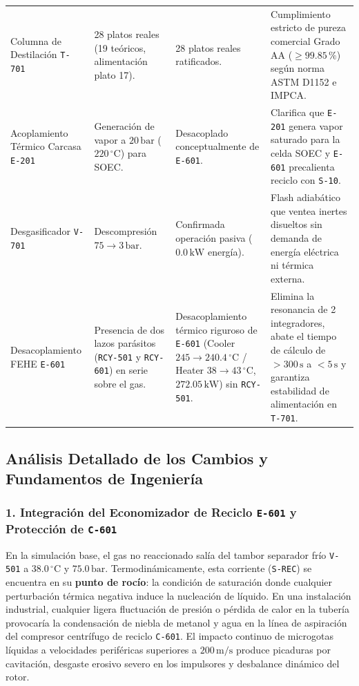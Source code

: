 \documentclass[11pt,a4paper]{article}
\begin{document}
\begin{table}[H]
\begin{tabularx}{\textwidth}{p{3.8cm} p{3.3cm} p{3.5cm} X}
\addlinespace
Columna de Destilación \texttt{T-701} & 28 platos reales (19 teóricos, alimentación plato 17). & 28 platos reales ratificados. & Cumplimiento estricto de pureza comercial Grado AA ($\ge 99.85\,\%$) según norma ASTM D1152 e IMPCA. \\
\addlinespace
Acoplamiento Térmico Carcasa \texttt{E-201} & Generación de vapor a $20\,\text{bar}$ ($220\,^\circ\text{C}$) para SOEC. & Desacoplado conceptualmente de \texttt{E-601}. & Clarifica que \texttt{E-201} genera vapor saturado para la celda SOEC y \texttt{E-601} precalienta reciclo con \texttt{S-10}. \\
\addlinespace
Desgasificador \texttt{V-701} & Descompresión $75 \to 3\,\text{bar}$. & Confirmada operación pasiva ($0.0\,\text{kW}$ energía). & Flash adiabático que ventea inertes disueltos sin demanda de energía eléctrica ni térmica externa. \\
\addlinespace
Desacoplamiento FEHE \texttt{E-601} & Presencia de dos lazos parásitos (\texttt{RCY-501} y \texttt{RCY-601}) en serie sobre el gas. & Desacoplamiento térmico riguroso de \texttt{E-601} (Cooler $245 \to 240.4\,^\circ\text{C}$ / Heater $38 \to 43\,^\circ\text{C}$, $272.05\,\text{kW}$) sin \texttt{RCY-501}. & Elimina la resonancia de 2 integradores, abate el tiempo de cálculo de $>300\,\text{s}$ a $<5\,\text{s}$ y garantiza estabilidad de alimentación en \texttt{T-701}. \\
\bottomrule
\end{tabularx}
\end{table}

\subsection{Análisis Detallado de los Cambios y Fundamentos de Ingeniería}

\subsubsection{1. Integración del Economizador de Reciclo \texttt{E-601} y Protección de \texttt{C-601}}
En la simulación base, el gas no reaccionado salía del tambor separador frío \texttt{V-501} a $38.0\,^\circ\text{C}$ y $75.0\,\text{bar}$. Termodinámicamente, esta corriente (\texttt{S-REC}) se encuentra en su \textbf{punto de rocío}: la condición de saturación donde cualquier perturbación térmica negativa induce la nucleación de líquido.
En una instalación industrial, cualquier ligera fluctuación de presión o pérdida de calor en la tubería provocaría la condensación de niebla de metanol y agua en la línea de aspiración del compresor centrífugo de reciclo \texttt{C-601}. El impacto continuo de microgotas líquidas a velocidades periféricas superiores a $200\,\text{m/s}$ produce picaduras por cavitación, desgaste erosivo severo en los impulsores y desbalance dinámico del rotor.
\end{document}
